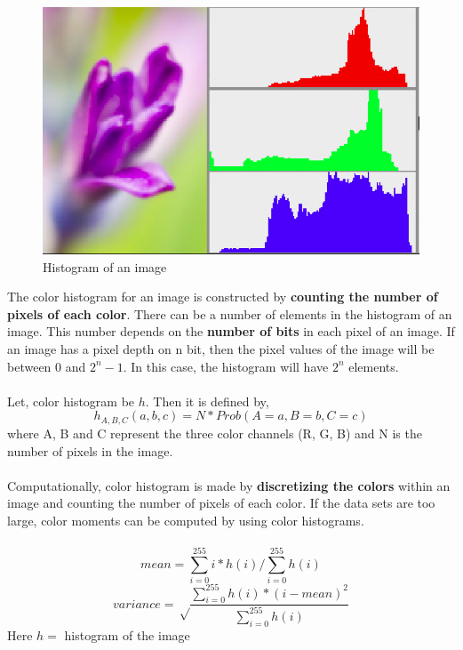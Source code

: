 \documentclass[pstricks,10pt,notitlepage]{report}
\begin{document}
\begin{figure}[!h]
\centering
        \includegraphics[width=.8\linewidth]{hist_example.png}
    \caption{Histogram of an image}
    \label{fig:verticalcell}
\end{figure}
The color histogram for an image is constructed by \textbf{counting the number of pixels of each color}. There can be a number of elements in the histogram of an image. This number depends on the \textbf{number of bits} in each pixel of an image. If an image has a pixel depth on n bit, then the pixel values of the image will be between $0$  and $2^n-1$. In this case, the histogram will have $2^{n}$ elements.\\
\\
Let, color histogram be $h$. Then it is defined by,\\
\begin{equation}
h_{A,B,C}(a,b,c)=N*Prob(A=a,B=b,C=c)\label{eq:4}
\end{equation}
where A, B and C represent the three color channels (R, G, B) and N is the number of pixels in the image.\\
\\
Computationally, color histogram is made by \textbf{discretizing the colors} within an image and counting the number of pixels of each color. If the data sets are too large, color moments can be computed  by using color histograms.\\
\\ 
\begin{equation}
mean=\sum_{i=0}^{255}i*h(i)/\sum_{i=0}^{255}h(i)\label{eq:5}
\end{equation}
\begin{equation}
variance=\sqrt \frac{\displaystyle \sum_{i=0}^{255}h(i)*(i-mean)^2}{\displaystyle\sum_{i=0}^{255}h(i)}\label{eq:6}
\end{equation}
Here $h=$ histogram of the image\\
\end{document}
